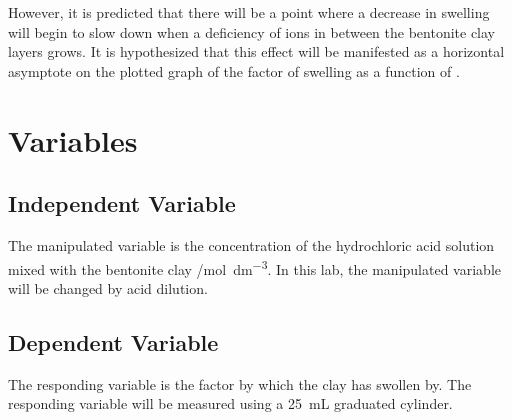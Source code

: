\documentclass[11pt, letterpaper]{article}
\begin{document}
However, it is predicted that there will be a point where
a decrease in swelling will begin to slow down when a deficiency
of  ions in between the bentonite clay layers grows.
It is hypothesized that this effect will be manifested
as a horizontal asymptote on the plotted graph of the factor
of swelling as a function of \ce{[H+]}.

\section{Variables}

\begin{paracol}{2}
    \subsection{Independent Variable}
    The manipulated variable is the concentration of the hydrochloric acid solution mixed with the
    bentonite clay /\unit{mol.dm^{-3}}. In this lab, the manipulated variable will be
    changed by acid dilution.
    \switchcolumn
    \subsection{Dependent Variable}
    The responding variable is the factor by which the clay has swollen by.
    The responding variable will be measured using a \SI{25}{mL} graduated cylinder.

\end{paracol}
\end{document}
